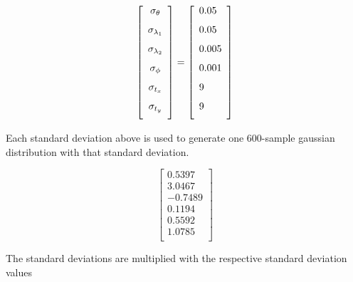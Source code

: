 \begin{equation*}
\left[\begin{array}{ccc}
\sigma_\theta \vspace{0.1in}\\
\sigma_{\lambda_1} \vspace{0.1in}\\
\sigma_{\lambda_2} \vspace{0.1in}\\
\sigma_\phi \vspace{0.1in}\\
\sigma_{t_x} \vspace{0.1in}\\
\sigma_{t_y} \vspace{0.1in}\\
\end{array}
\right]=
\left[
\begin{array}{lllllllllll}
0.05\vspace{0.1in}\\
0.05\vspace{0.1in}\\
0.005\vspace{0.1in}\\
0.001\vspace{0.1in}\\
9\vspace{0.1in}\\
9\vspace{0.1in}\\
\end{array}
\right]
\end{equation*}

Each standard deviation above is used to generate one 600-sample gaussian distribution with that standard deviation.


\begin{equation*}
\left[
\begin{array}{rrrrrrrr}
    0.5397\\
    3.0467\\
   -0.7489\\
    0.1194\\
    0.5592\\
    1.0785\\
\end{array}
\right]
\end{equation*}

The standard deviations are multiplied with the respective standard deviation values 



